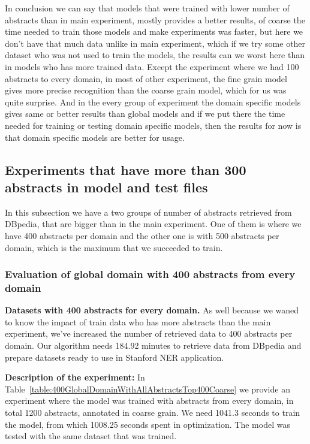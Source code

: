 \documentclass[thesis=M,english]{FITthesis}[2018/05/30]
\begin{document}
In conclusion we can say that models that were trained with lower number of abstracts than in main experiment, mostly provides a better results, of coarse the time needed to train those models and make experiments was faster, but here we don't have that much data unlike in main experiment, which if we try some other dataset who was not used to train the models, the results can we worst here than in models who has more trained data. Except the experiment where we had 100 abstracts to every domain, in most of other experiment, the fine grain model gives more precise recognition than the coarse grain model, which for us was quite surprise. And in the every group of experiment the domain specific models gives same or better results than global models and if we put there the time needed for training or testing domain specific models, then the results for now is that domain specific models are better for usage. 

\subsection{Experiments that have more than 300 abstracts in model and test files}\label{MoreThan300Abstracts}
In this subsection we have a two groups of number of abstracts retrieved from DBpedia, that are bigger than in the main experiment. One of them is where we have 400 abstracts per domain and the other one is with 500 abstracts per domain, which is the maximum that we succeeded to train.

\subsubsection{Evaluation of global domain with 400 abstracts from every domain }
\textbf{Datasets with 400 abstracts for every domain.} As well because we waned to know the impact of train data who has more abstracts than the main experiment, we've increased the number of retrieved data to 400 abstracts per domain. Our algorithm needs 184.92 minutes to retrieve data from DBpedia and prepare datasets ready to use in Stanford NER application.

\textbf{Description of the experiment:} In Table~\ref{table:400GlobalDomainWithAllAbstractsTop400Coarse} we provide an experiment where the model was trained with abstracts from every domain, in total 1200 abstracts, annotated in coarse grain. We need 1041.3 seconds to train the model, from which 1008.25 seconds spent in optimization. The model was tested with the same dataset that was trained.    
\end{document}
